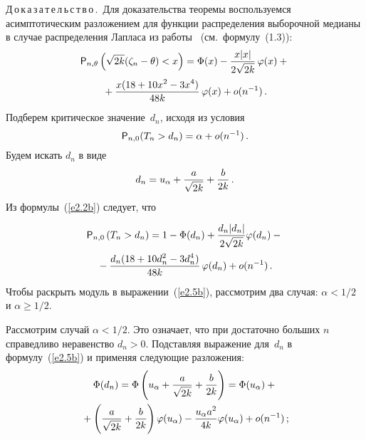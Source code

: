 \begin{multicols}{2}
\medskip

\noindent
Д\,о\,к\,а\,з\,а\,т\,е\,л\,ь\,с\,т\,в\,о\,.\
Для доказательства теоремы воспользуемся асимптотическим разложением
для функции распределения выборочной медианы в случае
распределения Лапласа из работы~\cite{1ben} (см.\ формулу~(1.3)):
\begin{multline}
{\sf P}_{n,\theta} \left( \sqrt{2k}(\zeta_n - \theta) < x \right) = 
\Phi(x)-\displaystyle\frac{\displaystyle x|x|\mathstrut}{\displaystyle 2\sqrt{2k}\mathstrut}\,\varphi(x)+{}\\
{}+
\displaystyle\frac{\displaystyle x(18+10x^2-3x^4)\mathstrut}{\displaystyle 48k\mathstrut}\,\varphi(x)+ o(n^{-1})\,.
\label{e2.2b}
\end{multline}
Подберем критическое значение~$d_n$, исходя из условия
\begin{equation*}
{\sf P}_{n,0}(T_n>d_n)=\alpha+ o(n^{-1})\,.
\end{equation*}
Будем искать $d_n$ в виде
\begin{equation*}
d_n = u_\alpha +\displaystyle\frac{\displaystyle a\mathstrut}{\displaystyle \sqrt{2k}\mathstrut}+\displaystyle\frac{\displaystyle b\mathstrut}{\displaystyle 2k\mathstrut}\,.
\end{equation*}
Из формулы~(\ref{e2.2b}) следует, что

\noindent
\begin{multline}
{\sf P}_{n, 0} \left( T_n> d_n \right) = 1 -
\Phi(d_n)+\displaystyle\frac{\displaystyle d_n|d_n|\mathstrut}{\displaystyle 2\sqrt{2k}\mathstrut}\varphi(d_n)-{}\\
{}-
\displaystyle\frac{\displaystyle d_n(18+10d_n^2-3d_n^4)\mathstrut}{\displaystyle 48k\mathstrut}\,\varphi(d_n)+ o(n^{-1})\,.
\label{e2.5b}
\end{multline}
Чтобы раскрыть модуль в выражении~(\ref{e2.5b}),  рас\-смот\-рим два случая:
$\alpha<1/2$ и $\alpha \ge 1/2$.

Рассмотрим случай $\alpha < 1/2$. Это означает, что при достаточно
больших $n$ справедливо неравенство $d_n > 0$.
Подставляя выражение для~$d_n$ в формулу~(\ref{e2.5b}) и применяя следующие разложения:
\begin{multline*}
\Phi(d_n)=\Phi\left(u_\alpha+\displaystyle\frac{\displaystyle a\mathstrut}{\displaystyle \sqrt{2k}\mathstrut}+\displaystyle\frac{\displaystyle b\mathstrut}{\displaystyle 2k\mathstrut}\right)=
\Phi(u_\alpha)+{}\\
{}+
\left(\displaystyle\frac{\displaystyle a\mathstrut}{\displaystyle \sqrt{2k}\mathstrut}+\displaystyle\frac{\displaystyle b\mathstrut}{\displaystyle 2k\mathstrut}\right)\varphi(u_\alpha)-
\displaystyle\frac{\displaystyle u_\alpha a^2\mathstrut}{\displaystyle 4k\mathstrut}\varphi(u_\alpha)+ o(n^{-1})\,;
\end{multline*}
\vspace*{-12pt}


\end{multicols}
